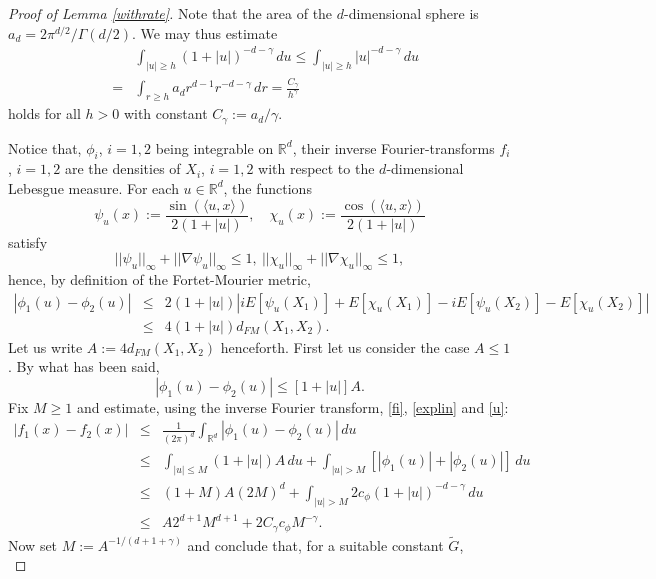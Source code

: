 \documentclass{article}
\begin{document}
\begin{proof}[Proof of Lemma \ref{withrate}] Note that the area of the $d$-dimensional sphere is $a_{d}=2\pi^{d/2}/\Gamma(d/2)$.{}
We may thus estimate
\begin{eqnarray}\nonumber
& & \int_{|u|\geq h}(1+|u|)^{-d-\gamma}\, du\leq \int_{|u|\geq h}|u|^{-d-\gamma}\, du\\
&=& \int_{r\geq h}a_{d}r^{d-1}r^{-d-\gamma}\, dr= 
\frac{C_{\gamma}}{h^{\gamma}}	
\label{explin}
\end{eqnarray}
holds for all $h>0$ with constant $C_{\gamma}:=a_{d}/\gamma$.

Notice that, $\phi_{i}$, $i=1,2$ being integrable on $\mathbb{R}^{d}$, their inverse Fourier-transforms
$f_{i}$, $i=1,2$ are the densities of $X_{i}$, $i=1,2$ with respect to the $d$-dimensional Lebesgue measure.
For each $u\in\mathbb{R}^{d}$, the functions 
$$
\psi_{u}(x):=\frac{\sin(\langle u,x\rangle)}{2(1+|u|)},\quad \chi_{u}(x):=\frac{\cos(\langle u,x\rangle)}{2(1+|u|)}$$
satisfy
$$
||\psi_{u}||_{\infty}+||\nabla \psi_{u}||_{\infty}\leq 1,\ ||\chi_{u}||_{\infty}+||\nabla \chi_{u}||_{\infty}\leq 1,
$$
hence, by definition of the Fortet-Mourier metric,
\begin{eqnarray*}
|\phi_{1}(u)-\phi_{2}(u)| &\leq& 2(1+|u|)|iE[\psi_{u}(X_{1})] +E[\chi_{u}(X_{1})]-iE[\psi_{u}(X_{2})] -E[\chi_{u}(X_{2})]|
\\ &\leq&{}
4(1+|u|)d_{FM}(X_{1},X_{2}).
\end{eqnarray*}
Let us write $A:=4 d_{FM}(X_{1},X_{2})$ henceforth. 
First let us consider
the case $A\leq 1$. 
By what has been said, 
\begin{equation}\label{u}
|\phi_{1}(u)-\phi_{2}(u)|\leq [1+|u|]A.
\end{equation}
Fix $M\geq 1$ and estimate, using the inverse Fourier transform, \eqref{fi}, \eqref{explin} and \eqref{u}:
\begin{eqnarray} \nonumber
|f_{1}(x)-f_{2}(x)| &\leq&	\frac{1}{(2\pi)^{d}}\int_{\mathbb{R}^{d}}|\phi_{1}(u)-\phi_{2}(u)|\, du\\
\label{modi} &\leq& \int_{|u|\leq M} (1+|u|) A\, du+\int_{|u|> M}[|\phi_{1}(u)|+|\phi_{2}(u)|]\, du \\
\nonumber &\leq& (1+M)A (2M)^{d}+\int_{|u|> M}2c_{\phi}(1+|u|)^{-d-\gamma}\, du\\
\nonumber &\leq& A2^{d+1}M^{d+1}+2C_{\gamma}c_{\phi}M^{-\gamma}.
\end{eqnarray}
Now set $M:=A^{-1/(d+1+\gamma)}$ and conclude that, for a suitable constant $\tilde{G}$,
\begin{equation}\label{madar}

\end{equation}
\end{proof}
\end{document}
